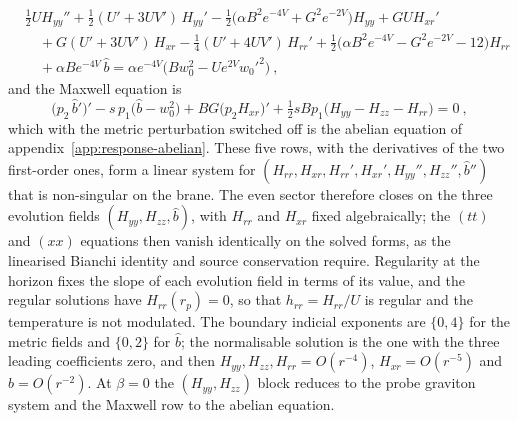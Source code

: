 \begin{equation}
\begin{split}
&\tfrac12 U H_{yy}'' + \tfrac12(U' + 3UV')\,H_{yy}' - \tfrac12\big(\alpha B^2e^{-4V} + G^2e^{-2V}\big)H_{yy}
+ GUH_{xr}' \\
&\quad + G(U' + 3UV')\,H_{xr} - \tfrac14(U' + 4UV')\,H_{rr}' + \tfrac12\big(\alpha B^2e^{-4V} - G^2e^{-2V} - 12\big)H_{rr} \\
&\quad + \alpha Be^{-4V}\,\hat b = \alpha e^{-4V}\big(Bw_0^2 - Ue^{2V}w_0'^2\big)~,
\end{split}
\end{equation}
and the Maxwell equation is
\begin{equation}
\big(p_2\,\hat b'\big)' - s\,p_1\big(\hat b - w_0^2\big) + BG\big(p_2 H_{xr}\big)'
+ \tfrac12 sBp_1\big(H_{yy} - H_{zz} - H_{rr}\big) = 0~,
\end{equation}
which with the metric perturbation switched off is the abelian equation of appendix~\ref{app:response-abelian}.
These five rows, with the derivatives of the two first-order ones, form a
linear system for $(H_{rr}, H_{xr}, H_{rr}', H_{xr}', H_{yy}'', H_{zz}'', \hat b'')$
that is non-singular on the brane. The even sector therefore closes on the
three evolution fields $(H_{yy}, H_{zz}, \hat b)$, with $H_{rr}$ and $H_{xr}$
fixed algebraically; the $(tt)$ and $(xx)$ equations then vanish identically
on the solved forms, as the linearised Bianchi identity and source
conservation require. Regularity at the horizon fixes the slope of
each evolution field in terms of its value, and the regular solutions have
$H_{rr}(r_p) = 0$, so that $h_{rr} = H_{rr}/U$ is regular and the
temperature is not modulated. The boundary indicial exponents are
$\{0, 4\}$ for the metric fields and $\{0, 2\}$ for $\hat b$; the
normalisable solution is the one with the three leading coefficients zero,
and then $H_{yy}, H_{zz}, H_{rr} = O(r^{-4})$, $H_{xr} = O(r^{-5})$ and
$\hat b = O(r^{-2})$. At $\beta = 0$ the $(H_{yy}, H_{zz})$ block reduces to
the probe graviton system and the Maxwell row to the abelian equation.

